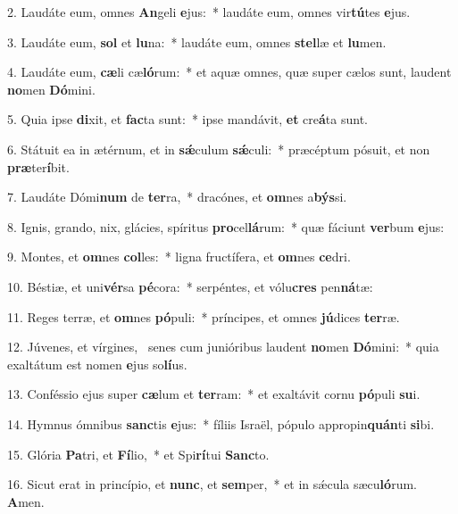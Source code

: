 2. Laudáte eum, omnes \textbf{An}geli \textbf{e}jus:~*  laudáte eum, omnes vir\textbf{tú}tes \textbf{e}jus.\

3. Laudáte eum, \textbf{sol} et \textbf{lu}na:~*  laudáte eum, omnes \textbf{stel}læ et \textbf{lu}men.\

4. Laudáte eum, \textbf{cæ}li cæ\textbf{ló}rum:~*  et aquæ omnes, quæ super cælos sunt, laudent \textbf{no}men \textbf{Dó}mini.\

5. Quia ipse \textbf{di}xit, et \textbf{fac}ta sunt:~*  ipse mandávit, \textbf{et} cre\textbf{á}ta sunt.\

6. Státuit ea in ætérnum, et in \textbf{sǽ}culum \textbf{sǽ}culi:~*  præcéptum pósuit, et non \textbf{præ}ter\textbf{í}bit.\

7. Laudáte Dómi\textbf{num} de \textbf{ter}ra,~*  dracónes, et \textbf{om}nes a\textbf{býs}si.\

8. Ignis, grando, nix, glácies, spíritus \textbf{pro}cel\textbf{lá}rum:~*  quæ fáciunt \textbf{ver}bum \textbf{e}jus:\

9. Montes, et \textbf{om}nes \textbf{col}les:~*  ligna fructífera, et \textbf{om}nes \textbf{ce}dri.\

10. Béstiæ, et uni\textbf{vér}sa \textbf{pé}cora:~*  serpéntes, et vólu\textbf{cres} pen\textbf{ná}tæ:\

11. Reges terræ, et \textbf{om}nes \textbf{pó}puli:~*  príncipes, et omnes \textbf{jú}dices \textbf{ter}ræ.\

12. Júvenes, et vírgines, \dag\  senes cum junióribus laudent \textbf{no}men \textbf{Dó}mini:~*  quia exaltátum est nomen \textbf{e}jus so\textbf{lí}us.\

13. Conféssio ejus super \textbf{cæ}lum et \textbf{ter}ram:~*  et exaltávit cornu \textbf{pó}puli \textbf{su}i.\

14. Hymnus ómnibus \textbf{sanc}tis \textbf{e}jus:~*  fíliis Israël, pópulo appropin\textbf{quán}ti \textbf{si}bi.\

15. Glória \textbf{Pa}tri, et \textbf{Fí}lio,~*  et Spi\textbf{rí}tui \textbf{Sanc}to.\

16. Sicut erat in princípio, et \textbf{nunc}, et \textbf{sem}per,~*  et in sǽcula sæcu\textbf{ló}rum. \textbf{A}men.\


